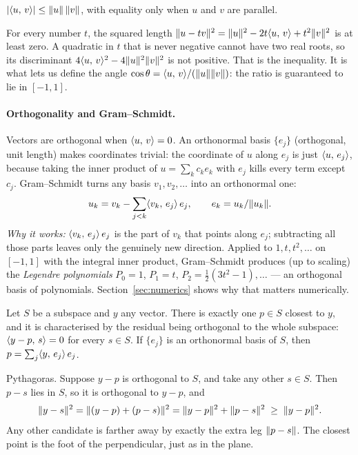 \begin{result}
$|\langle u,\, v\rangle| \le \lVert u\rVert\,\lVert v\rVert$, with equality only when $u$ and $v$ are parallel.
\end{result}
\begin{intuition}
For every number $t$, the squared length $\lVert u - t v\rVert^2 = \lVert u\rVert^2 - 2t\langle u,\, v\rangle + t^2\lVert v\rVert^2$ is at least
zero. A quadratic in $t$ that is never negative cannot have two real roots, so its discriminant
$4\langle u,\, v\rangle^2 - 4\lVert u\rVert^2\lVert v\rVert^2$ is not positive. That is the inequality. It is what lets us define the angle
$\cos\theta = \langle u,\, v\rangle/(\lVert u\rVert\lVert v\rVert)$: the ratio is guaranteed to lie in $[-1,1]$.
\end{intuition}

\paragraph{Orthogonality and Gram--Schmidt.} Vectors are orthogonal when $\langle u,\, v\rangle = 0$. An orthonormal basis
$\{e_j\}$ (orthogonal, unit length) makes coordinates trivial: the coordinate of $u$ along $e_j$ is just
$\langle u,\, e_j\rangle$, because taking the inner product of $u = \sum_k c_k e_k$ with $e_j$ kills every term except
$c_j$. Gram--Schmidt turns any basis $v_1, v_2, \dots$ into an orthonormal one:
\begin{equation}
  u_k = v_k - \sum_{j<k} \langle v_k,\, e_j\rangle\, e_j, \qquad e_k = u_k / \lVert u_k\rVert.
\end{equation}
\emph{Why it works:} $\langle v_k,\, e_j\rangle\, e_j$ is the part of $v_k$ that points along $e_j$; subtracting all those parts
leaves only the genuinely new direction. Applied to $1, t, t^2, \dots$ on $[-1,1]$ with the integral inner product,
Gram--Schmidt produces (up to scaling) the \emph{Legendre polynomials} $P_0 = 1$, $P_1 = t$,
$P_2 = \tfrac12(3t^2-1), \dots$ --- an orthogonal basis of polynomials. Section~\ref{sec:numerics} shows why that
matters numerically.

\begin{result}
\label{res:projection}
Let $S$ be a subspace and $y$ any vector. There is exactly one $p \in S$ closest to $y$, and it is characterised by
the residual being orthogonal to the whole subspace: $\langle y - p,\, s\rangle = 0$ for every $s \in S$.
If $\{e_j\}$ is an orthonormal basis of $S$, then $p = \sum_j \langle y,\, e_j\rangle\, e_j$.
\end{result}
\begin{intuition}
Pythagoras. Suppose $y - p$ is orthogonal to $S$, and take any other $s \in S$. Then $p - s$ lies in $S$, so it is
orthogonal to $y - p$, and
\[
  \lVert y - s\rVert^2 = \lVert (y - p) + (p - s)\rVert^2 = \lVert y-p\rVert^2 + \lVert p-s\rVert^2 \;\ge\; \lVert y - p\rVert^2 .
\]
Any other candidate is farther away by exactly the extra leg $\lVert p - s\rVert$. The closest point is the foot of the
perpendicular, just as in the plane.
\end{intuition}

